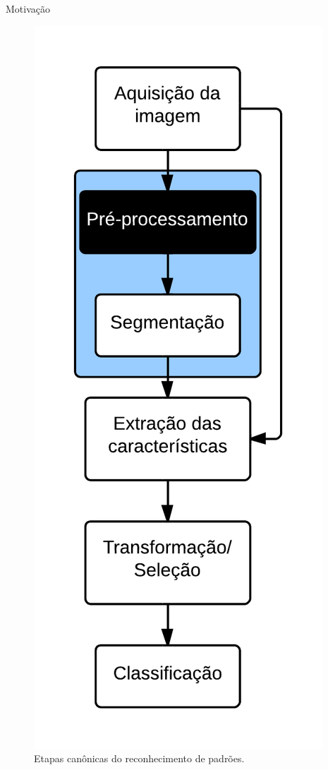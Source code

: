 \documentclass{beamer}
\begin{document}
\begin{frame}[plain]{Motivação}
  \setlength\leftmargini{1em}
  \begin{figure}
    \includegraphics[height=0.9\textheight]{figuras/flow.png}
    \caption{Etapas canônicas do reconhecimento de padrões.}
  \end{figure}
\end{frame}
\end{document}
